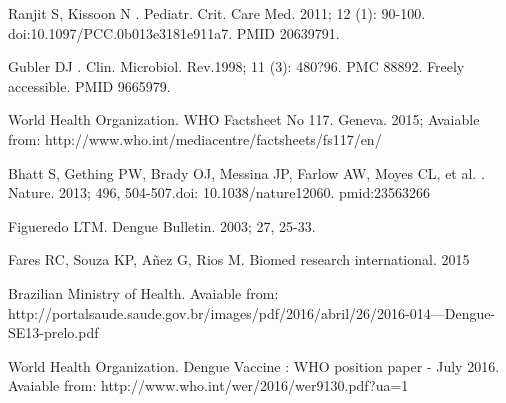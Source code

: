 \documentclass[final,leqno]{siamltexmm2}
\begin{document}
\begin{thebibliography}{10}







 Ranjit S, Kissoon N
.
\newblock  Pediatr. Crit. Care Med. 2011; 12 (1): 90-100. doi:10.1097/PCC.0b013e3181e911a7. PMID 20639791.

 Gubler DJ 
.
\newblock Clin. Microbiol. Rev.1998; 11 (3): 480?96. PMC 88892. Freely accessible. PMID 9665979.

World Health Organization.
\newblock  WHO Factsheet No 117. Geneva. 2015; Avaiable from: http://www.who.int/mediacentre/factsheets/fs117/en/ 

Bhatt S, Gething PW, Brady OJ, Messina JP, Farlow AW, Moyes CL, et al. 
.
\newblock  Nature. 2013; 496, 504-507.doi: 10.1038/nature12060. pmid:23563266

Figueredo LTM.  
\newblock  Dengue Bulletin. 2003; 27, 25-33.

Fares RC, Souza KP, Añez G, Rios M.
\newblock Biomed research international. 2015

Brazilian Ministry of Health. 
\newblock  Avaiable from: http://portalsaude.saude.gov.br/images/pdf/2016/abril/26/2016-014---Dengue-SE13-prelo.pdf

World Health Organization.
\newblock Dengue Vaccine : WHO position paper - July 2016.  Avaiable from: http://www.who.int/wer/2016/wer9130.pdf?ua=1


\end{thebibliography}
\end{document}
